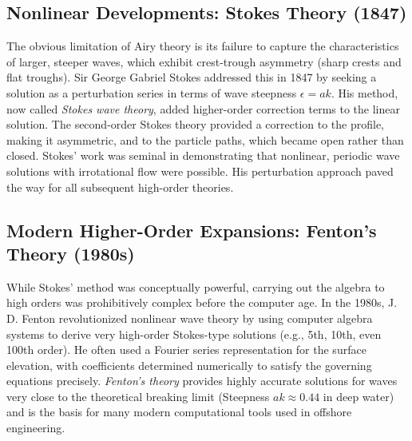 \documentclass[11pt,letterpaper]{article}
\begin{document}
\subsection{Nonlinear Developments: Stokes Theory (1847)}
The obvious limitation of Airy theory is its failure to capture the characteristics of larger, steeper waves, which exhibit crest-trough asymmetry (sharp crests and flat troughs). Sir George Gabriel Stokes addressed this in 1847 by seeking a solution as a perturbation series in terms of wave steepness $\epsilon = ak$. His method, now called \emph{Stokes wave theory}, added higher-order correction terms to the linear solution. The second-order Stokes theory provided a correction to the profile, making it asymmetric, and to the particle paths, which became open rather than closed. Stokes' work was seminal in demonstrating that nonlinear, periodic wave solutions with irrotational flow were possible. His perturbation approach paved the way for all subsequent high-order theories.

\subsection{Modern Higher-Order Expansions: Fenton's Theory (1980s)}
While Stokes' method was conceptually powerful, carrying out the algebra to high orders was prohibitively complex before the computer age. In the 1980s, J. D. Fenton revolutionized nonlinear wave theory by using computer algebra systems to derive very high-order Stokes-type solutions (e.g., 5th, 10th, even 100th order). He often used a Fourier series representation for the surface elevation, with coefficients determined numerically to satisfy the governing equations precisely. \emph{Fenton's theory} provides highly accurate solutions for waves very close to the theoretical breaking limit (Steepness $ak \approx 0.44$ in deep water) and is the basis for many modern computational tools used in offshore engineering.
\end{document}

